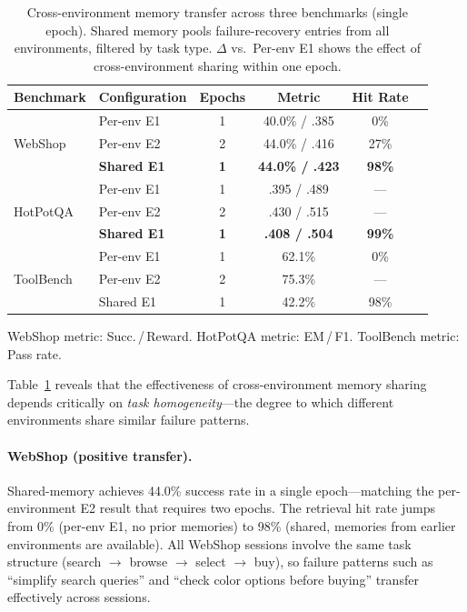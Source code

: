 \begin{table}[h]
\centering
\caption{Cross-environment memory transfer across three benchmarks (single epoch). Shared memory pools failure-recovery entries from all environments, filtered by task type. $\Delta$ vs.\ Per-env E1 shows the effect of cross-environment sharing within one epoch.}
\label{tab:cross_env}
\small
\begin{tabular}{llcccc}
\toprule
Benchmark & Configuration & Epochs & Metric & Hit Rate \\
\midrule
\multirow{3}{*}{WebShop} & Per-env E1 & 1 & 40.0\% / .385 & 0\% \\
 & Per-env E2 & 2 & 44.0\% / .416 & 27\% \\
 & \textbf{Shared E1} & \textbf{1} & \textbf{44.0\% / .423} & \textbf{98\%} \\
\midrule
\multirow{3}{*}{HotPotQA} & Per-env E1 & 1 & .395 / .489 & --- \\
 & Per-env E2 & 2 & .430 / .515 & --- \\
 & \textbf{Shared E1} & \textbf{1} & \textbf{.408 / .504} & \textbf{99\%} \\
\midrule
\multirow{3}{*}{ToolBench} & Per-env E1 & 1 & 62.1\% & 0\% \\
 & Per-env E2 & 2 & 75.3\% & --- \\
 & Shared E1 & 1 & 42.2\% & 98\% \\
\bottomrule
\end{tabular}
\vspace{0.3em}

{\footnotesize WebShop metric: Succ.\,/\,Reward. HotPotQA metric: EM\,/\,F1. ToolBench metric: Pass rate.}
\end{table}

Table~\ref{tab:cross_env} reveals that the effectiveness of cross-environment memory sharing depends critically on \emph{task homogeneity}---the degree to which different environments share similar failure patterns.

\paragraph{WebShop (positive transfer).} Shared-memory \method{} achieves 44.0\% success rate in a single epoch---matching the per-environment E2 result that requires two epochs. The retrieval hit rate jumps from 0\% (per-env E1, no prior memories) to 98\% (shared, memories from earlier environments are available). All WebShop sessions involve the same task structure (search $\to$ browse $\to$ select $\to$ buy), so failure patterns such as ``simplify search queries'' and ``check color options before buying'' transfer effectively across sessions.

